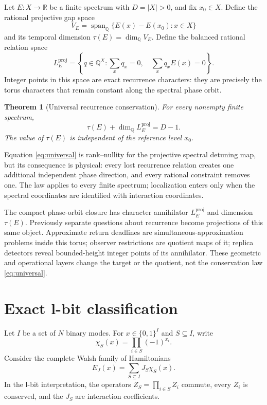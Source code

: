 \documentclass[10pt]{article}
\newtheorem{theorem}{Theorem}
\theoremstyle{definition}
\newcommand{\Q}{\mathbb Q}
\newcommand{\R}{\mathbb R}
\newcommand{\spanQ}{\operatorname{span}_{\Q}}
\begin{document}
Let \(E:X\to\R\) be a finite spectrum with \(D=|X|>0\), and fix
\(x_0\in X\). Define the rational projective gap space
\begin{equation}
 V_E=\spanQ\{E(x)-E(x_0):x\in X\}
 \label{eq:gapspace}
\end{equation}
and its temporal dimension
\(\tau(E)=\dim_{\Q}V_E\). Define the balanced rational relation space
\begin{equation}
 L_E^{\mathrm{proj}}=
 \left\{q\in\Q^X:
 \sum_xq_x=0,\quad
 \sum_xq_xE(x)=0\right\}.
 \label{eq:relations}
\end{equation}
Integer points in this space are exact recurrence characters: they are
precisely the torus characters that remain constant along the spectral
phase orbit.

\begin{theorem}[Universal recurrence conservation]
For every nonempty finite spectrum,
\begin{equation}
 \boxed{
 \tau(E)+\dim_{\Q}L_E^{\mathrm{proj}}=D-1.}
 \label{eq:universal}
\end{equation}
The value of \(\tau(E)\) is independent of the reference level \(x_0\).
\end{theorem}

Equation \eqref{eq:universal} is rank--nullity for the projective spectral
detuning map, but its consequence is physical: every lost recurrence
relation creates one additional independent phase direction, and every
rational constraint removes one. The law applies to every finite spectrum;
localization enters only when the spectral coordinates are identified with
interaction coordinates.

The compact phase-orbit closure has character annihilator
\(L_E^{\mathrm{proj}}\) and dimension \(\tau(E)\). Previously separate
questions about recurrence become projections of this same object.
Approximate return deadlines are simultaneous-approximation problems inside
this torus; observer restrictions are quotient maps of it; replica
detectors reveal bounded-height integer points of its annihilator. These
geometric and operational layers change the target or the quotient, not the
conservation law \eqref{eq:universal}.

\section{Exact l-bit classification}

Let \(I\) be a set of \(N\) binary modes. For
\(x\in\{0,1\}^{I}\) and \(S\subseteq I\), write
\[
 \chi_S(x)=\prod_{i\in S}(-1)^{x_i}.
\]
Consider the complete Walsh family of Hamiltonians
\begin{equation}
 E_J(x)=\sum_{S\subseteq I}J_S\chi_S(x).
 \label{eq:lbit}
\end{equation}
In the l-bit interpretation, the operators \(Z_S=\prod_{i\in S}Z_i\)
commute, every \(Z_i\) is conserved, and the \(J_S\) are interaction
coefficients.
\end{document}
